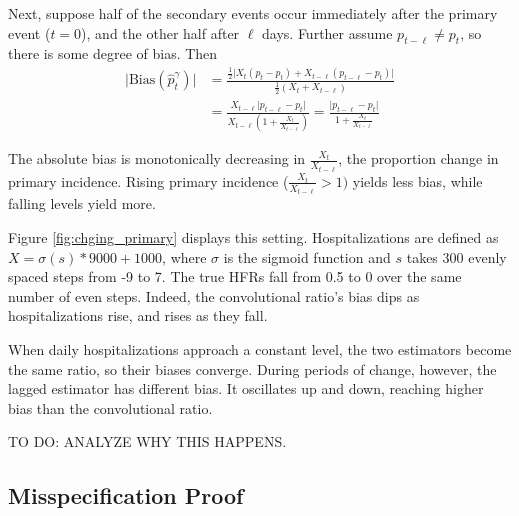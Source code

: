 \documentclass{article}
\begin{document}
Next, suppose half of the secondary events occur immediately after the primary event ($t=0$), and the other half after $\ell$ days. Further assume $p_{t-\ell}\neq p_t$, so there is some degree of bias. Then
\begin{align*}
    \lvert\text{Bias}(\hat{p}_t^{\gamma})\rvert &= \frac{\frac{1}{2}\big\lvert X_{t}(p_t-p_t) + X_{t-\ell}(p_{t-\ell}-p_t)\big\rvert}{\frac{1}{2}(X_{t}+X_{t-\ell})} \\
    &=\frac{X_{t-\ell}\lvert p_{t-\ell}-p_t\rvert}{X_{t-\ell}(1+\frac{X_{t}}{X_{t-\ell}})} = \frac{\lvert p_{t-\ell}-p_t \rvert}{1+\frac{X_{t}}{X_{t-\ell}}}
\end{align*}

The absolute bias is monotonically decreasing in $\frac{X_{t}}{X_{t-\ell}}$, the proportion change in primary incidence. Rising primary incidence ($\frac{X_{t}}{X_{t-\ell}}>1)$ yields less bias, while falling levels yield more.

Figure \ref{fig:chging_primary} displays this setting. Hospitalizations are defined as $X = \sigma(s)*9000+1000$, where $\sigma$ is the sigmoid function and $s$ takes 300 evenly spaced steps from -9 to 7. The true HFRs fall from 0.5 to 0 over the same number of even steps. Indeed, the convolutional ratio's bias dips as hospitalizations rise, and rises as they fall. 

When daily hospitalizations approach a constant level, the two estimators become the same ratio, so their biases converge. During periods of change, however, the lagged estimator has different bias. It oscillates up and down, reaching higher bias than the convolutional ratio. 

TO DO: ANALYZE WHY THIS HAPPENS.

\subsection{Misspecification Proof}\label{apx:misp_pf}
\end{document}

